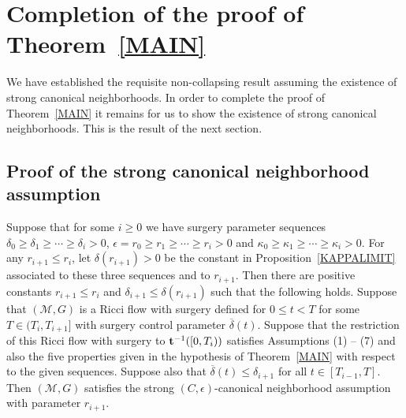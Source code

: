 \chapter{Completion of the proof of Theorem~{\ref{MAIN}}}

We have established the requisite non-collapsing result assuming the
existence of strong canonical neighborhoods. In order to complete
the proof of Theorem~\ref{MAIN} it remains for us to show the
existence of strong canonical neighborhoods. This is the result of
the next section.


\section{Proof of the strong canonical neighborhood assumption}\label{sectcannbhd}


 \begin{proposition}
\label{prop:canonical-neighborhood-extends}
\label{extend}
Suppose that for some $i\ge 0$ we have surgery parameter sequences
$\delta_0\ge \delta_1\ge\cdots\ge \delta_i>0$, $\epsilon=r_0\ge
r_1\ge \cdots\ge r_i>0$ and $\kappa_0\ge \kappa_1\ge \cdots\ge
\kappa_i>0$. For any $r_{i+1}\le r_i$, let $\delta(r_{i+1})>0$ be
the constant in Proposition~\ref{KAPPALIMIT} associated to these
three sequences and to $r_{i+1}$.
 Then there are positive
constants $r_{i+1}\le r_i$ and $\delta_{i+1}\le\delta(r_{i+1})$ such that the
following holds. Suppose that $({\mathcal M},G)$ is a Ricci flow with surgery
defined for $0\le t<T$ for some $T\in (T_i,T_{i+1}]$ with surgery control
parameter $\overline\delta(t)$. Suppose that the restriction of this Ricci flow
with surgery to ${\bf t}^{-1}([0,T_i))$ satisfies Assumptions (1) -- (7) and
also the five properties given in the hypothesis of Theorem~\ref{MAIN} with
respect to the given sequences. Suppose also that $\overline\delta(t)\le
\delta_{i+1}$ for all $t\in [T_{i-1},T]$. Then $({\mathcal M},G)$  satisfies
the strong $(C,\epsilon)$-canonical neighborhood assumption with parameter
$r_{i+1}$.
 \end{proposition}



